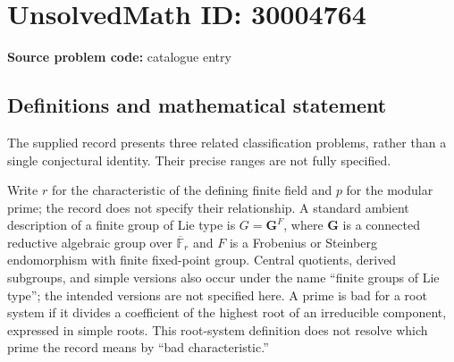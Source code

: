 \documentclass[11pt]{article}
\newcommand{\F}{\mathbb{F}}
\begin{document}
\section*{UnsolvedMath ID: 30004764}
\textbf{Source problem code:} catalogue entry
\subsection{Definitions and mathematical statement}
The supplied record presents three related classification problems, rather than a single conjectural identity. Their precise ranges are not fully specified.

Write \(r\) for the characteristic of the defining finite field and \(p\) for the modular prime; the record does not specify their relationship. A standard ambient description of a finite group of Lie type is \(G=\mathbf G^F\), where \(\mathbf G\) is a connected reductive algebraic group over \(\overline{\F}_r\) and \(F\) is a Frobenius or Steinberg endomorphism with finite fixed-point group. Central quotients, derived subgroups, and simple versions also occur under the name ``finite groups of Lie type''; the intended versions are not specified here. A prime is bad for a root system if it divides a coefficient of the highest root of an irreducible component, expressed in simple roots. This root-system definition does not resolve which prime the record means by ``bad characteristic.''
\end{document}
